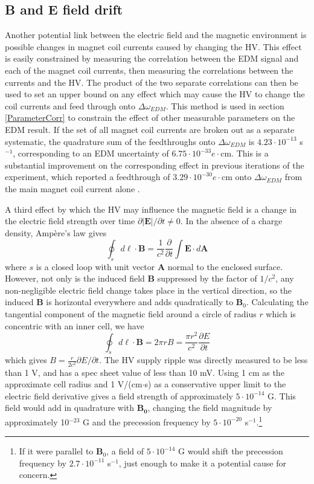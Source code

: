 \documentclass [10pt, twoside] {uwthesis}[2012/04/02]
\begin{document}
\subsection{B and E field drift}
Another potential link between the electric field and the magnetic environment is possible changes in magnet coil currents caused by changing the HV. This effect is easily constrained by measuring the correlation between the EDM signal and each of the magnet coil currents, then measuring the correlations between the currents and the HV. The product of the two separate correlations can then be used to set an upper bound on any effect which may cause the HV to change the coil currents and feed through onto $\Delta\omega_{EDM}$. This method is used in section \ref{ParameterCorr} to constrain the effect of other measurable parameters on the EDM result. If the set of all magnet coil currents are broken out as a separate systematic, the quadrature sum of the feedthroughs onto $\Delta\omega_{EDM}$ is $4.23 \cdot 10^{-13}$ s$^{-1}$, corresponding to an EDM uncertainty of $6.75 \cdot 10^{-33} e\cdot \text{cm}$. This is a substantial improvement on the corresponding effect in previous iterations of the experiment, which reported a feedthrough of $3.29 \cdot 10^{-30} e\cdot \text{cm}$ onto $\Delta\omega_{EDM}$ from the main magnet coil current alone \cite{2013_Hg_EDM_PRA}.

A third effect by which the HV may influence the magnetic field is a change in the electric field strength over time $\partial|\mathbf{E}|/\partial t \neq 0$. In the absence of a charge density, Amp\`{e}re's law gives \cite{Jackson}
\begin{equation}
\oint_s d\ell \cdot \mathbf{B} = \dfrac{1}{c^2}\dfrac{\partial}{\partial t} \int \mathbf{E} \cdot d\mathbf{A}
\end{equation}
where $s$ is a closed loop with unit vector $\mathbf{A}$ normal to the enclosed surface. However, not only is the induced field $\mathbf{B}$ suppressed by the factor of $1/c^2$, any non-negligible electric field change takes place in the vertical direction, so the induced $\mathbf{B}$ is horizontal everywhere and adds quadratically to $\mathbf{B}_0$. Calculating the tangential component of the magnetic field around a circle of radius $r$ which is concentric with an inner cell, we have 
\begin{equation}
\oint_s d\ell \cdot \mathbf{B} = 2\pi r B = \dfrac{\pi r^2}{c^2} \dfrac{\partial E}{\partial t}
\end{equation} 
which gives $B = \frac{r}{2c^2} \partial E/\partial t$. The HV supply ripple was directly measured to be less than 1 V, and has a spec sheet value of less than 10 mV. Using 1 cm as the approximate cell radius and 1 V/(cm$\cdot$s) as a conservative upper limit to the electric field derivative gives a field strength of approximately $5 \cdot 10^{-14}$ G. This field would add in quadrature with $\mathbf{B_0}$, changing the field magnitude by approximately 10$^{-23}$ G and the precession frequency by $5 \cdot 10^{-20}$ s$^{-1}$.\footnote{If it were parallel to $\mathbf{B}_0$, a field of $5 \cdot 10^{-14}$ G would shift the precession frequency by $2.7 \cdot 10^{-11}$ s$^{-1}$, just enough to make it a potential cause for concern.} 
\end{document}
